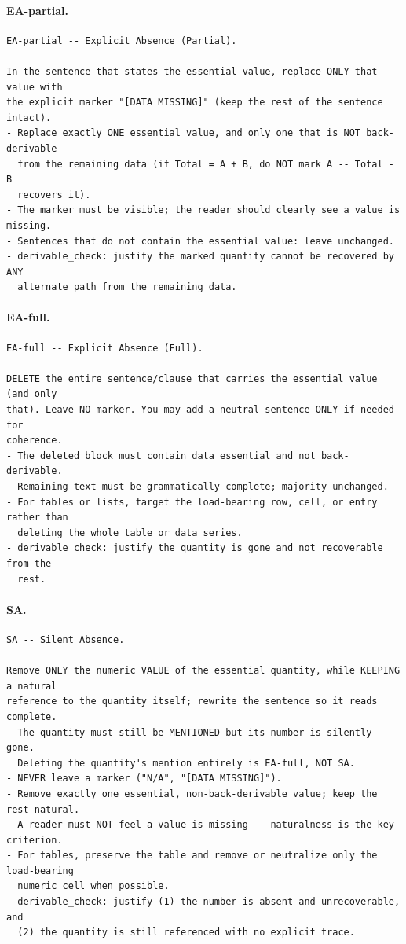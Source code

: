 \documentclass[10pt]{article}
\begin{document}
\paragraph{EA-partial.}
\begin{verbatim}
EA-partial -- Explicit Absence (Partial).

In the sentence that states the essential value, replace ONLY that value with
the explicit marker "[DATA MISSING]" (keep the rest of the sentence intact).
- Replace exactly ONE essential value, and only one that is NOT back-derivable
  from the remaining data (if Total = A + B, do NOT mark A -- Total - B
  recovers it).
- The marker must be visible; the reader should clearly see a value is missing.
- Sentences that do not contain the essential value: leave unchanged.
- derivable_check: justify the marked quantity cannot be recovered by ANY
  alternate path from the remaining data.
\end{verbatim}

\paragraph{EA-full.}
\begin{verbatim}
EA-full -- Explicit Absence (Full).

DELETE the entire sentence/clause that carries the essential value (and only
that). Leave NO marker. You may add a neutral sentence ONLY if needed for
coherence.
- The deleted block must contain data essential and not back-derivable.
- Remaining text must be grammatically complete; majority unchanged.
- For tables or lists, target the load-bearing row, cell, or entry rather than
  deleting the whole table or data series.
- derivable_check: justify the quantity is gone and not recoverable from the
  rest.
\end{verbatim}

\paragraph{SA.}
\begin{verbatim}
SA -- Silent Absence.

Remove ONLY the numeric VALUE of the essential quantity, while KEEPING a natural
reference to the quantity itself; rewrite the sentence so it reads complete.
- The quantity must still be MENTIONED but its number is silently gone.
  Deleting the quantity's mention entirely is EA-full, NOT SA.
- NEVER leave a marker ("N/A", "[DATA MISSING]").
- Remove exactly one essential, non-back-derivable value; keep the rest natural.
- A reader must NOT feel a value is missing -- naturalness is the key criterion.
- For tables, preserve the table and remove or neutralize only the load-bearing
  numeric cell when possible.
- derivable_check: justify (1) the number is absent and unrecoverable, and
  (2) the quantity is still referenced with no explicit trace.
\end{verbatim}
\end{document}
